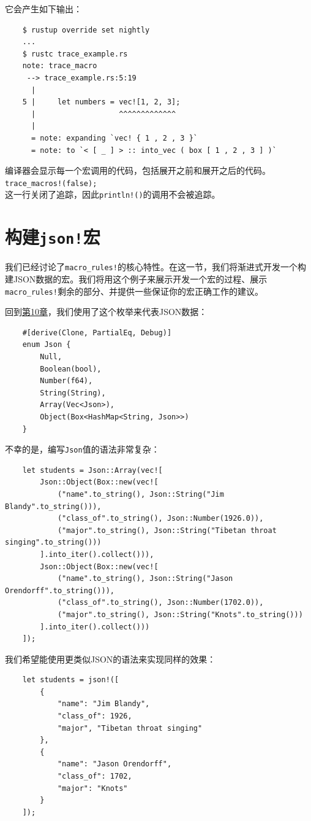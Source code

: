 它会产生如下输出：
\begin{verbatim}
    $ rustup override set nightly
    ...
    $ rustc trace_example.rs
    note: trace_macro
     --> trace_example.rs:5:19
      |
    5 |     let numbers = vec![1, 2, 3];
      |                   ^^^^^^^^^^^^^
      |
      = note: expanding `vec! { 1 , 2 , 3 }`
      = note: to `< [ _ ] > :: into_vec ( box [ 1 , 2 , 3 ] )`
\end{verbatim}
编译器会显示每一个宏调用的代码，包括展开之前和展开之后的代码。\texttt{trace\_macros!(false);}\\
这一行关闭了追踪，因此\texttt{println!()}的调用不会被追踪。

\section{构建\texttt{json!}宏}

我们已经讨论了\texttt{macro\_rules!}的核心特性。在这一节，我们将渐进式开发一个构建JSON数据的宏。我们将用这个例子来展示开发一个宏的过程、展示\texttt{macro\_rules!}剩余的部分、并提供一些保证你的宏正确工作的建议。

回到\hyperref[ch10]{第10章}，我们使用了这个枚举来代表JSON数据：
\begin{verbatim}
    #[derive(Clone, PartialEq, Debug)]
    enum Json {
        Null,
        Boolean(bool),
        Number(f64),
        String(String),
        Array(Vec<Json>),
        Object(Box<HashMap<String, Json>>)
    }
\end{verbatim}

不幸的是，编写\texttt{Json}值的语法非常复杂：
\begin{verbatim}
    let students = Json::Array(vec![
        Json::Object(Box::new(vec![
            ("name".to_string(), Json::String("Jim Blandy".to_string())),
            ("class_of".to_string(), Json::Number(1926.0)),
            ("major".to_string(), Json::String("Tibetan throat singing".to_string()))
        ].into_iter().collect())),
        Json::Object(Box::new(vec![
            ("name".to_string(), Json::String("Jason Orendorff".to_string())),
            ("class_of".to_string(), Json::Number(1702.0)),
            ("major".to_string(), Json::String("Knots".to_string()))
        ].into_iter().collect()))
    ]);
\end{verbatim}

我们希望能使用更类似JSON的语法来实现同样的效果：
\begin{verbatim}
    let students = json!([
        {
            "name": "Jim Blandy",
            "class_of": 1926,
            "major", "Tibetan throat singing"
        },
        {
            "name": "Jason Orendorff",
            "class_of": 1702,
            "major": "Knots"
        }
    ]);
\end{verbatim}

